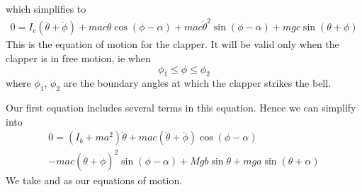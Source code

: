 \documentclass{article}
\begin{document}
which simplifies to
\begin{equation}
\begin{array}{c}
0 = I_c (\ddot{\theta} + \ddot{\phi})
+ mac \ddot{\theta} \cos(\phi - \alpha) 
+ mac \dot{\theta}^2 \sin(\phi - \alpha)
+ mgc \sin(\theta + \phi)
\end{array}
\label{eq:motion2}
\end{equation}
This is the equation of motion for the clapper. It will be valid only when the
clapper is in free motion, ie when 
\begin{equation}
\phi_1 \leq \phi \leq \phi_2
\end{equation}
where $\phi_1$, $\phi_2$ are the boundary angles at which the clapper strikes the bell.

Our first equation  includes several terms in this equation. Hence
we can simplify  into
\begin{equation}
\begin{array}{c}
0 = (I_b + ma^2) \ddot{\theta} + mac(\ddot{\theta} + \ddot{\phi}) \cos (\phi - \alpha) \\
-mac (\dot{\theta} + \dot{\phi})^2 \sin(\phi - \alpha)
+ Mgb\sin{\theta}
+ mga \sin(\theta + \alpha)
\end{array}
\label{eq:motion3}
\end{equation}
We take  and  as our equations of motion.
\end{document}

